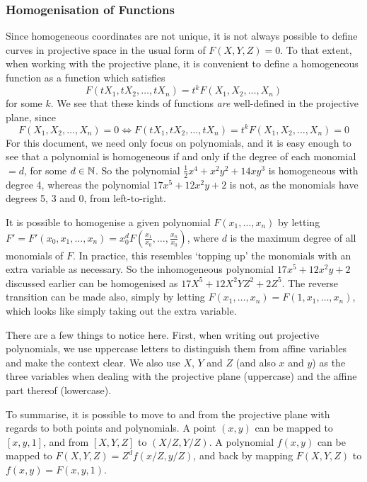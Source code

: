\subsubsection{Homogenisation of Functions}
Since homogeneous coordinates are not unique, it is not always possible to define curves in projective space in the usual form of $F(X,Y,Z)=0$. To that extent, when working with the projective plane, it is convenient to define a homogeneous function as a function which satisfies
$$F(tX_1,tX_2,\ldots,tX_n)=t^k F(X_1,X_2,\ldots,X_n)$$
for some $k$. We see that these kinds of functions \emph{are} well-defined in the projective plane, since
$$F(X_1,X_2,\ldots,X_n)=0 \Leftrightarrow F(tX_1,tX_2,\ldots,tX_n) = t^k F(X_1,X_2,\ldots,X_n) = 0$$
For this document, we need only focus on polynomials, and it is easy enough to see that a polynomial is homogeneous if and only if the degree of each monomial $= d$, for some $d \in \mathbb{N}$.
So the polynomial $\frac{1}{2}x^4 + x^2y^2 + 14xy^3$ is homogeneous with degree 4, whereas the polynomial $17x^5 + 12x^2y + 2$ is not, as the monomials have degrees 5, 3 and 0, from left-to-right.

It is possible to homogenise a given polynomial $F(x_1,\ldots,x_n)$ by letting $F' = F'(x_0,x_1,\ldots,x_n) = x_0^d F(\frac{x_1}{x_0},\ldots,\frac{x_n}{x_0})$, where $d$ is the maximum degree of all monomials of $F$. In practice, this resembles `topping up' the monomials with an extra variable as necessary.
So the inhomogeneous polynomial $17x^5 + 12x^2y + 2$ discussed earlier can be homogenised as $17X^5 + 12X^2YZ^2 + 2Z^5$.
The reverse transition can be made also, simply by letting $F(x_1,\ldots,x_n) = F(1,x_1,\ldots,x_n)$, which looks like simply taking out the extra variable.

There are a few things to notice here.
First, when writing out projective polynomials, we use uppercase letters to distinguish them from affine variables and make the context clear.
We also use $X$, $Y$ and $Z$ (and also $x$ and $y$) as the three variables when dealing with the projective plane (uppercase) and the affine part thereof (lowercase).

To summarise, it is possible to move to and from the projective plane with regards to both points and polynomials.
A point $(x,y)$ can be mapped to $[x,y,1]$, and from $[X,Y,Z]$ to $(X/Z,Y/Z)$.
A polynomial $f(x,y)$ can be mapped to $F(X,Y,Z) = Z^d f(x/Z,y/Z)$, and back by mapping $F(X,Y,Z)$ to $f(x,y) = F(x,y,1)$.

